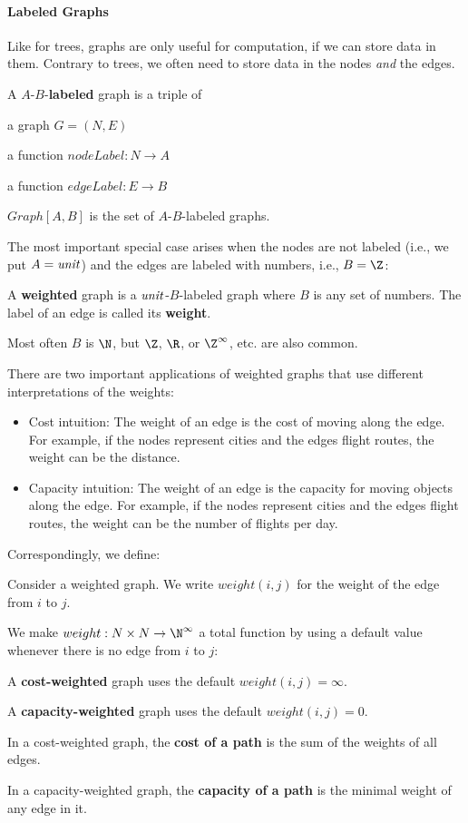 \paragraph{Labeled Graphs}
Like for trees, graphs are only useful for computation, if we can store data in them.
Contrary to trees, we often need to store data in the nodes \emph{and} the edges.

\begin{definition}
A $A$-$B$-\textbf{labeled} graph is a triple of
\begin{compactitem}
 \item a graph $G=(N,E)$
 \item a function $nodeLabel:N\to A$
 \item a function $edgeLabel:E\to B$
\end{compactitem}
$Graph[A,B]$ is the set of $A$-$B$-labeled graphs.
\end{definition}

The most important special case arises when the nodes are not labeled (i.e., we put $A=\mathit{unit}$) and the edges are labeled with numbers, i.e., $B=\Z$:

\begin{definition}
A \textbf{weighted} graph is a $\mathit{unit}$-$B$-labeled graph where $B$ is any set of numbers.
The label of an edge is called its \textbf{weight}.
\end{definition}
Most often $B$ is $\N$, but $\Z$, $\R$, or $\Z^\infty$, etc. are also common.

There are two important applications of weighted graphs that use different interpretations of the weights:
\begin{itemize}
 \item Cost intuition: The weight of an edge is the cost of moving along the edge.
 For example, if the nodes represent cities and the edges flight routes, the weight can be the distance.
 \item Capacity intuition: The weight of an edge is the capacity for moving objects along the edge.
 For example, if the nodes represent cities and the edges flight routes, the weight can be the number of flights per day.
\end{itemize}

Correspondingly, we define:
\begin{definition}
Consider a weighted graph.
We write $weight(i,j)$ for the weight of the edge from $i$ to $j$.

We make $weight:N\times N\to \N^\infty$ a total function by using a default value whenever there is no edge from $i$ to $j$:
\begin{compactitem}
 \item A \textbf{cost-weighted} graph uses the default $weight(i,j)=\infty$.
 \item A \textbf{capacity-weighted} graph uses the default $weight(i,j)=0$.
\end{compactitem}

In a cost-weighted graph, the \textbf{cost of a path} is the sum of the weights of all edges.

In a capacity-weighted graph, the \textbf{capacity of a path} is the minimal weight of any edge in it.
\end{definition}

